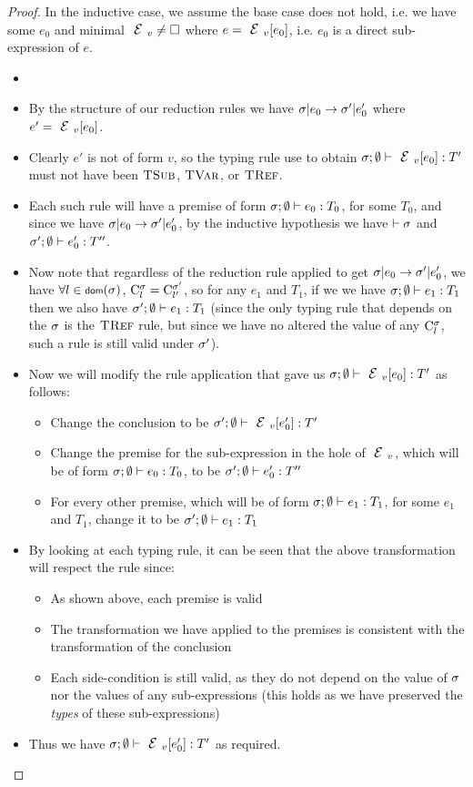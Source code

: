 \begin{proof}
	
		In the inductive case, we assume the base case does not hold, i.e.
		we have some $e_0$ and minimal $\EV \neq \hole$ where $e = \EV[e_0]$,
		i.e. $e_0$ is a direct sub-expression of $e$.
		\begin{itemize}
			\item {}
			\item By the structure of our reduction rules we have $\s|e_0\rightarrow\s'|e'_0$
			where $e' = \EV[e_0]$.
			\item Clearly $e'$ is not of form $v$, so the typing rule use to obtain
			$\tyr{\EV[e_0]}{T'}$ must not have been $\textsc{TSub}$, $\textsc{TVar}$,
			or $\textsc{TRef}$.
			\item Each such rule will have a premise of form $\tyr{e_0}{T_0}$,
			for some $T_0$, and since we have $\s|e_0\rightarrow\s'|e'_0$,
			by the inductive hypothesis we have $\vdash\s$ and $\tyr[\s']{e'_0}{T''}$.
			\item Now note that regardless of the reduction rule applied to get $\s|e_0\rightarrow\s'|e'_0$,
			we have $\forall l\in\dom(\s)$, $\C{l} = \C[\s']{l'}$, so for
			any $e_1$ and $T_1$, if we we have $\tyr {e_1}{T_1}$
			then we also have $\tyr[\s']{e_1}{T_1}$ (since the only typing
			rule that depends on the $\s$ is the $\textsc{TRef}$ rule, but since
			we have no altered the value of any $\C{l}$, such a rule is still
			valid under $\s'$).
			\item Now we will modify the rule application that gave us $\tyr{\EV[e_0]}{T'}$
			as follows:
			\begin{itemize}
				\item Change the conclusion to be $\tyr[\s']{\EV[e'_0]}{T'}$
				\item Change the premise for the sub-expression in the hole of $\EV$, which
				will be of form $\tyr{e_0}{T_0}$, to be $\tyr[\s']{e'_0}{T''}$
				\item For every other premise, which will be of form $\tyr{e_1}{T_1}$,
				for some $e_1$ and $T_1$, change it to be $\tyr[\s']{e_1}{T_1}$
			\end{itemize}
			\item By looking at each typing rule, it can be seen that the above transformation
			will respect the rule since:
			\begin{itemize}
				\item As shown above, each premise is valid
				\item The transformation we have applied to the premises is consistent with
				the transformation of the conclusion
				\item Each side-condition is still valid, as they do not depend on the value
				of $\s$ nor the values of any sub-expressions (this holds as we have
				preserved the \emph{types} of these sub-expressions)
			\end{itemize}
			\item Thus we have $\tyr{\EV[e'_0]}{T'}$ as required.
		\end{itemize}



\end{proof}
